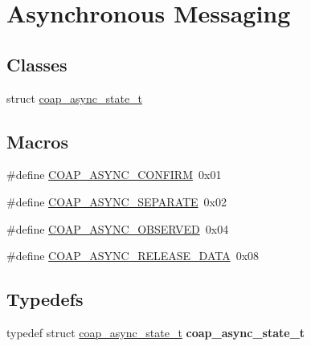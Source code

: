 \hypertarget{group__coap__async}{}\section{Asynchronous Messaging}
\label{group__coap__async}
\subsection*{Classes}
\begin{DoxyCompactItemize}
\item 
struct \hyperlink{structcoap__async__state__t}{coap\+\_\+async\+\_\+state\+\_\+t}
\end{DoxyCompactItemize}
\subsection*{Macros}
\begin{DoxyCompactItemize}
\item 
\#define \hyperlink{group__coap__async_gaf3c112eaa3f262731ed3507a228bf776}{C\+O\+A\+P\+\_\+\+A\+S\+Y\+N\+C\+\_\+\+C\+O\+N\+F\+I\+R\+M}~0x01
\item 
\#define \hyperlink{group__coap__async_ga0e2fc01767b333ad5badc838014049e6}{C\+O\+A\+P\+\_\+\+A\+S\+Y\+N\+C\+\_\+\+S\+E\+P\+A\+R\+A\+T\+E}~0x02
\item 
\#define \hyperlink{group__coap__async_gac7fcd5adcc9fb3cc90ba2ce6695ee6d0}{C\+O\+A\+P\+\_\+\+A\+S\+Y\+N\+C\+\_\+\+O\+B\+S\+E\+R\+V\+E\+D}~0x04
\item 
\#define \hyperlink{group__coap__async_gab13ab4a40fab483ee2eaef1ac39fd1d8}{C\+O\+A\+P\+\_\+\+A\+S\+Y\+N\+C\+\_\+\+R\+E\+L\+E\+A\+S\+E\+\_\+\+D\+A\+T\+A}~0x08
\end{DoxyCompactItemize}
\subsection*{Typedefs}
\begin{DoxyCompactItemize}
\item 
\hypertarget{group__coap__async_ga6e8319b71d55c3d7fb4dcfc7d5cab3ed}{}typedef struct \hyperlink{structcoap__async__state__t}{coap\+\_\+async\+\_\+state\+\_\+t} {\bfseries coap\+\_\+async\+\_\+state\+\_\+t}\label{group__coap__async_ga6e8319b71d55c3d7fb4dcfc7d5cab3ed}

\end{DoxyCompactItemize}
